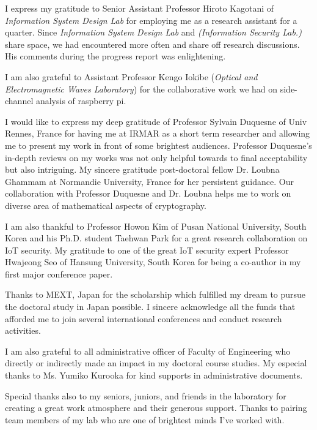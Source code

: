 \vspace{5pt}
I express my gratitude to Senior Assistant Professor Hiroto Kagotani of \textit{Information System Design Lab} for employing me as a research assistant for a quarter. 
Since \textit{Information System Design Lab} and \textit{(Information Security Lab.)} share space, we had encountered more often and share off research discussions.
His comments during the progress report was enlightening.

\vspace{5pt}
I am also grateful to Assistant Professor Kengo Iokibe (\textit{Optical and Electromagnetic Waves Laboratory}) for the collaborative work we had on side-channel analysis of raspberry pi.

\vspace{5pt}
I would like to express my deep gratitude of Professor Sylvain Duquesne of  Univ  Rennes, France for having me at IRMAR as a short term researcher and allowing me to present my work in front of some brightest audiences.
Professor Duquesne's in-depth reviews on my works was not only helpful towards to final acceptability but also intriguing.   
My sincere gratitude post-doctoral fellow Dr. Loubna Ghammam at Normandie University, France for her persistent guidance.
Our collaboration with  Professor Duquesne and Dr. Loubna helps me to work on diverse area of mathematical aspects of cryptography.

\vspace{5pt}
I am also thankful to Professor Howon Kim of Pusan National University, South Korea and his Ph.D. student Taehwan Park for  a great research collaboration on IoT security.
My gratitude to one of the great IoT security expert Professor Hwajeong Seo of Hansung University, South Korea for being a co-author in my first major conference paper.

\vspace{5pt}
Thanks to MEXT, Japan  for the scholarship which fulfilled my dream to pursue the  doctoral study in Japan possible.
I sincere acknowledge all the funds that afforded me to join several international conferences and conduct research activities.
 
 \vspace{5pt}
I am also grateful to all  administrative officer of Faculty of Engineering who directly or indirectly made an impact in my doctoral course studies. My especial thanks to Ms. Yumiko Kurooka for kind supports in administrative documents.

\vspace{5pt}
Special thanks also to my seniors, juniors, and friends in the  laboratory for creating a great work atmosphere and  their generous support.  
Thanks to pairing team members of my lab who are one of brightest minds I've worked with.

